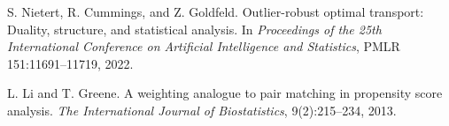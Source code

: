 S. Nietert, R. Cummings, and Z. Goldfeld.
\newblock Outlier-robust optimal transport: Duality, structure, and statistical analysis.
\newblock In \emph{Proceedings of the 25th International Conference on Artificial Intelligence and Statistics}, PMLR 151:11691--11719, 2022.

L. Li and T. Greene.
\newblock A weighting analogue to pair matching in propensity score analysis.
\newblock \emph{The International Journal of Biostatistics}, 9(2):215--234, 2013.
